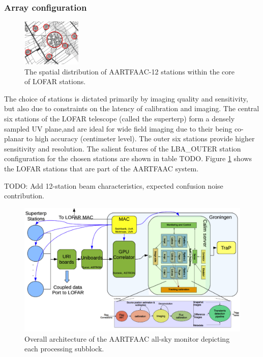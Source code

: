 \documentclass{aa}
\begin{document}
\subsubsection {\label{subsubsec:arrayconf} Array configuration}

\begin{figure}[htbp]
\centering
\includegraphics[width=0.25\textwidth]{Figs/afaac12_arrayconfig.png}
\caption{The spatial distribution of AARTFAAC-12 stations within the core of LOFAR stations.}
\label{fig:afaac12_arrayconfig}
\end{figure}

The choice of stations is dictated primarily by imaging quality and sensitivity,
but  also due  to constraints  on the  latency of  calibration and  imaging. The
central  six stations  of  the LOFAR  telescope (called  the  superterp) form  a
densely sampled UV plane,and are ideal for wide field imaging due to their being
co-planar to  high accuracy (centimeter  level). The outer six  stations provide
higher  sensitivity  and resolution.  The  salient  features of  the  LBA\_OUTER
station configuration  for the chosen stations  are shown in table  TODO. Figure
\ref{fig:afaac12_arrayconfig}  shows the  LOFAR stations  that are  part of  the
AARTFAAC system.

TODO: Add 12-station beam characteristics, expected confusion noise contribution.

\begin{figure}[htbp]
\centering
\includegraphics[width=1\textwidth]{Figs/overall_afaac_Arch_blks.png}
\caption {Overall  architecture of the  AARTFAAC all-sky monitor  depicting each
  processing subblock.}
\label{fig:afaac_arch}
\end{figure}
\end{document}
